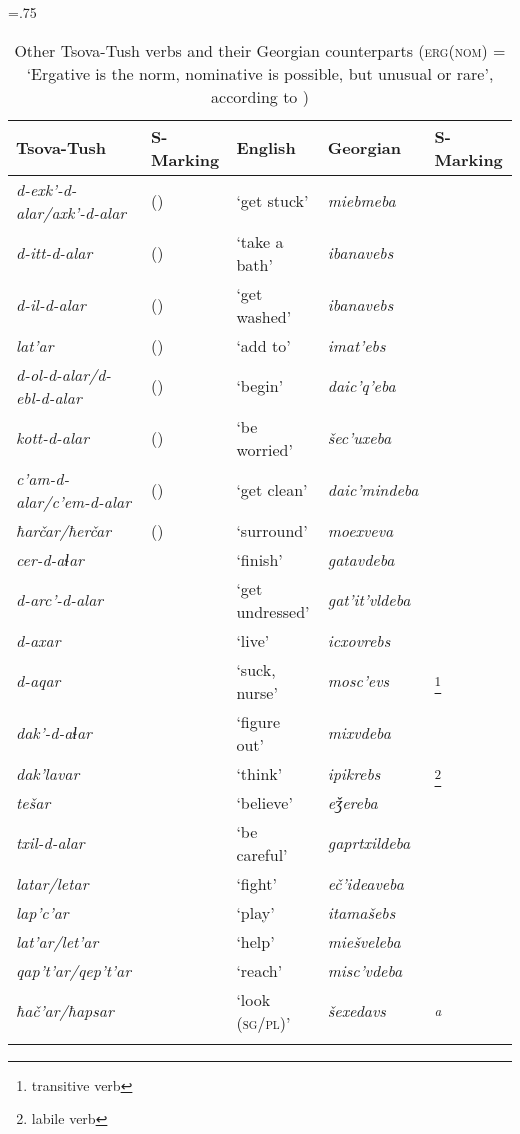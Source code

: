 \begin{table}
\small
\tabcolsep=.75\tabcolsep
\begin{tabular}{lllll}
\lsptoprule
	Tsova-Tush & {S-Marking} & {English} & {Georgian} & {S-Marking} \\
	\midrule
	\textit{d-exk'-d-alar/axk'-d-alar} & {\Erg} ({\Nom}) & `get stuck' & \textit{miebmeba} & {\Nom} \\
	\textit{d-itt-d-alar}  & {\Erg} ({\Nom}) & `take a bath' & \textit{ibanavebs} & {\Erg} \\
	\textit{d-il-d-alar}  & {\Erg} ({\Nom}) & `get washed' & \textit{ibanavebs} & {\Erg} \\
	\textit{lat'ar} & {\Erg} ({\Nom})  & `add to' & \textit{imat'ebs} & {\Erg}  \\
	\textit{d-ol-d-alar/d-ebl-d-alar}  & {\Erg} ({\Nom}) & `begin' & \textit{daic'q'eba} & {\Nom} \\
	\textit{kott-d-alar}  & {\Erg} ({\Nom}) & `be worried' & \textit{šec'uxeba} & {\Nom} \\
	\textit{c'am-d-alar/c'em-d-alar}  & {\Erg} ({\Nom}) & `get clean' & \textit{daic'mindeba} & {\Nom} \\
	\textit{ħarčar/ħerčar}  & {\Erg} ({\Nom}) & `surround' & \textit{moexveva} & {\Nom} \\ 
	\textit{cer-d-aɬar} & {\Erg}  & `finish'  & \textit{gatavdeba} & {\Nom} \\
	\textit{d-arc'-d-alar} & {\Erg} & `get undressed' & \textit{gat'it'vldeba} & {\Nom} \\
	\textit{d-axar}  & {\Erg} & `live'  & \textit{icxovrebs} & {\Erg} \\
	\textit{d-aqar}  & {\Erg} & `suck, nurse'  & \textit{mosc'evs} & {\Erg}\footnote{transitive verb} \\
	\textit{dak'-d-aɬar}  & {\Erg} & `figure out' & \textit{mixvdeba} & {\Nom} \\
	\textit{dak'lavar}  & {\Erg} & `think'  & \textit{ipikrebs} & {\Erg}\footnote{labile verb} \\
	\textit{tešar}  & {\Erg} & `believe'  & \textit{eǯereba} & {\Nom} \\
	\textit{txil-d-alar}  & {\Erg} & `be careful'  & \textit{gaprtxildeba} & {\Nom} \\
	\textit{latar/letar}  & {\Erg} & `fight' & \textit{eč'ideaveba} & {\Nom} \\
	\textit{lap'c'ar}  & {\Erg} & `play'  & \textit{itamašebs} & {\Erg} \\
	\textit{lat'ar/let'ar}  & {\Erg} & `help' & \textit{miešveleba} & {\Nom} \\
	\textit{qap't'ar/qep't'ar}  & {\Erg} & `reach' & \textit{misc'vdeba} & {\Nom} \\
	\textit{ħač'ar/ħapsar}  & {\Erg} & `look (\textsc{sg/pl})' & \textit{šexedavs} & {\Erg}\textsuperscript{\textit{a}}  \\
	\lspbottomrule
\end{tabular}
	\caption{Other Tsova-Tush verbs and their Georgian counterparts (\textsc{erg(nom)} = `Ergative is the norm, nominative is possible, but unusual or rare', according to \textcites[]{holisky87})}
	\label{verbderiv-table-other}
\end{table}

